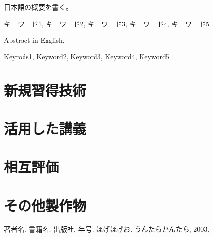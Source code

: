 \documentclass[openany,11pt,papersize,dvipdfm]{jsbook}
\begin{document}
%
\maketitle

\frontmatter

\begin{jabstract} 日本語の概要を書く。
\begin{jkeyword}
キーワード1, キーワード2, キーワード3, キーワード4, キーワード5
\end{jkeyword}
\end{jabstract}

\begin{eabstract} Abstract in English. 
\begin{ekeyword}
Keyrods1, Keyword2, Keyword3, Keyword4, Keyword5
\end{ekeyword}
\end{eabstract}

\tableofcontents%

\mainmatter%







\begin{appendix}

\chapter{新規習得技術}

\chapter{活用した講義}

\chapter{相互評価}

\chapter{その他製作物}

\end{appendix}


\begin{thebibliography}{9}
  著者名. 書籍名. 出版社,  年号.
  ほげほげお. うんたらかんたら,  2003.
\end{thebibliography}
\end{document}

